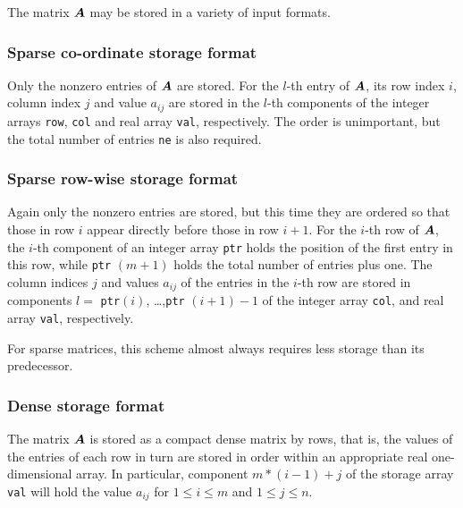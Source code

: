 \documentclass{galahad}
\begin{document}
\vspace*{-8mm}

\galmatrix
The matrix ${\bm{A}}$ may be stored in a variety of input formats.

\subsubsection{Sparse co-ordinate storage format}\label{coordinate}
Only the nonzero entries of ${\bm{A}}$ are stored.
For the $l$-th entry of ${\bm{A}}$,
its row index $i$, column index $j$ and value $a_{ij}$
are stored in the $l$-th components of the integer arrays {\tt row},
{\tt col} and real array {\tt val}, respectively.
The order is unimportant, but the total number of entries
{\tt ne} is also required.

\subsubsection{Sparse row-wise storage format}\label{rowwise}
Again only the nonzero entries are stored,
but this time they are ordered so that those in row $i$ appear directly
before those in row $i+1$. For the $i$-th row of ${\bm{A}}$, the $i$-th component
of an integer array {\tt ptr} holds the position of the first entry in this row,
while {\tt ptr} $(m+1)$ holds the total number of entries plus one.
The column indices $j$ and values $a_{ij}$ of the entries in the $i$-th row
are stored in components
$l =$ {\tt ptr}$(i)$, \ldots ,{\tt ptr} $(i+1)-1$ of the
integer array {\tt col}, and real array {\tt val}, respectively.

For sparse matrices, this scheme almost always requires less storage than
its predecessor.

\subsubsection{Dense storage format}\label{dense}
The matrix ${\bm{A}}$ is stored as a compact
dense matrix by rows, that is, the values of the entries of each row in turn are
stored in order within an appropriate real one-dimensional array.
In particular,
component $m \ast (i-1) + j$ of the storage array {\tt val}
will hold the value $a_{ij}$
for $1 \leq i \leq m$ and $1 \leq j \leq n$.



\end{document}
